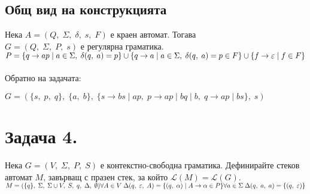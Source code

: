 \documentclass[12pt]{article}
\newcommand{\Lang}{\mathcal{L}}
\begin{document}

\subsection{Общ вид на конструкцията}

Нека $A = (Q, \; \Sigma, \; \delta, \; s, \; F)$ е краен автомат. Тогава \\

$G = (Q, \; \Sigma, \; P, \; s)$ е регулярна граматика. \\

$P = \{q \to ap \; | \; a \in \Sigma, \; \delta(q, \; a) = p\} \cup \{q \to a \; | \; a \in \Sigma, \; \delta(q, \; a) = p \in F\} \cup \\
\{f \to \varepsilon \; | \; f \in F\} $ \\\\

Обратно на задачата:

$G = (\{s, \; p, \; q\}, \; \{a, \; b\}, \; \{s \to bs \; | \; ap, \; p \to ap \; | \; bq \; | \; b, \; q \to ap \; | \;  bs \}, \; s)$ 

\section{Задача 4.}

Нека $G = (V, \; \Sigma, \; P, \; S)$ е контекстно-свободна граматика.
Дефинирайте стеков автомат $M$, завърващ с празен стек, за който $\Lang(M) = \Lang(G)$. \\

$M = (\{q\}, \; \Sigma, \; \Sigma \cup V, \; S, \; q, \; \Delta, \; \emptyset) \\\\
\forall A \in V \; \Delta(q, \; \varepsilon, \; A) = \{(q, \; \alpha) \; | \; A \to \alpha \in P\} \\\\
\forall a \in \Sigma \; \Delta(q, \; a, \; a) = \{(q, \; \varepsilon)\}$
\end{document}
